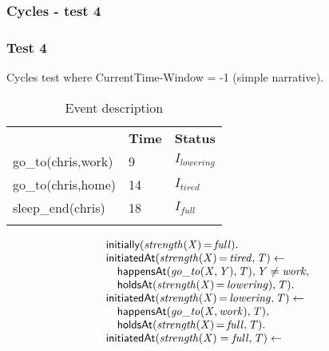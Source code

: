 \documentclass[8pt]{beamer}
\DeclareMathOperator{\val}{=}  %
\def \patsize {}
\def\happensAt{\textsf{\patsize happensAt}}
\def\initially{\textsf{\patsize initially}}
\def\holdsAt{\textsf{\patsize holdsAt}}
\def\initiatedAt{\textsf{\patsize initiatedAt}}
\newenvironment{mysplit}%
  {\arraycolsep 0pt \begin{array}{l}}%
  {\end{array}}
\begin{document}
\begin{frame}
    \frametitle{Cycles - test 4}
    \subsubsection{Test 4}
    \small
    Cycles test where CurrentTime-Window = -1 (simple narrative).\linebreak
    \begin{minipage}{0.4\linewidth}
        \begin{table}[t!]
            \caption{Event description}
            \begin{center}

                \begin{tabular}{lll}
                    \hline\noalign{\smallskip}
                    \multicolumn{1}{l}{\textbf{Event}} & \multicolumn{1}{c}{\textbf{Time}} & \multicolumn{1}{c}{\textbf{Status}} \\
                    go\_to(chris,work)& 9 & $I_{lowering}$\\
                    go\_to(chris,home)& 14 & $I_{tired}$\\
                    sleep\_end(chris)& 18 & $I_{full}$\\
                    \noalign{\smallskip}
                    \hline
                \end{tabular}
            \end{center}
        \end{table}
    \end{minipage}
    \begin{minipage}{0.55\linewidth}
        \begin{align*}
            \begin{mysplit}
                \initially\mathit{(strength(X)\val full)}.\\
                \initiatedAt\mathit{(strength(X)\val tired,T)\leftarrow}\\
                \quad    \happensAt\mathit{(go\_to(X,Y),T),Y\neq work,}\\
                \quad    \holdsAt\mathit{(strength(X)\val lowering),T).}\\
                \initiatedAt\mathit{(strength(X)\val lowering,T)\leftarrow}\\
                \quad    \happensAt\mathit{(go\_to(X,work),T),}\\
                \quad    \holdsAt\mathit{(strength(X)\val full,T).}\\
                \initiatedAt\mathit{(strength(X)=full,T)\leftarrow}\\

\end{mysplit}
\end{align*}
\end{minipage}
\end{frame}
\end{document}
